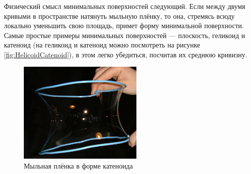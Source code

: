 Физический смысл минимальных поверхностей следующий. Если между двумя кривыми в пространстве натянуть мыльную плёнку, то она, стремясь всюду локально уменьшить свою площадь, примет форму минимальной поверхности. Самые простые примеры минимальных поверхностей --- плоскость, геликоид и катеноид (на геликоид и катеноид можно посмотреть на рисунке \ref{fig:HelicoidCatenoid}), в этом легко убедиться, посчитав их среднюю кривизну.

\begin{figure}[H]
	\centering
	\includegraphics[width=6cm]{./img/Membrane.png}
	\caption{Мыльная плёнка в форме катеноида}
\end{figure}



